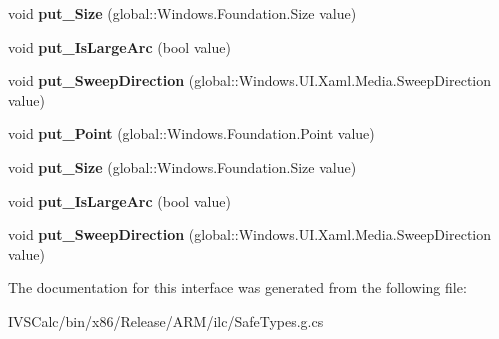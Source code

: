 \begin{DoxyCompactItemize}
\mbox{\label{interface_windows_1_1_u_i_1_1_xaml_1_1_media_1_1_i_arc_segment_a38665026a67cd69927958162dd6dc109}} 
void {\bfseries put\+\_\+\+Size} (global\+::\+Windows.\+Foundation.\+Size value)
\item 
\mbox{\label{interface_windows_1_1_u_i_1_1_xaml_1_1_media_1_1_i_arc_segment_ae090da4e0e10d6c6fba41eb81f4e56f4}} 
void {\bfseries put\+\_\+\+Is\+Large\+Arc} (bool value)
\item 
\mbox{\label{interface_windows_1_1_u_i_1_1_xaml_1_1_media_1_1_i_arc_segment_aa5c0f05483cfe843d18d35db2877ad20}} 
void {\bfseries put\+\_\+\+Sweep\+Direction} (global\+::\+Windows.\+U\+I.\+Xaml.\+Media.\+Sweep\+Direction value)
\item 
\mbox{\label{interface_windows_1_1_u_i_1_1_xaml_1_1_media_1_1_i_arc_segment_aa012b7d8361f03f19e160daaac966cb2}} 
void {\bfseries put\+\_\+\+Point} (global\+::\+Windows.\+Foundation.\+Point value)
\item 
\mbox{\label{interface_windows_1_1_u_i_1_1_xaml_1_1_media_1_1_i_arc_segment_a38665026a67cd69927958162dd6dc109}} 
void {\bfseries put\+\_\+\+Size} (global\+::\+Windows.\+Foundation.\+Size value)
\item 
\mbox{\label{interface_windows_1_1_u_i_1_1_xaml_1_1_media_1_1_i_arc_segment_ae090da4e0e10d6c6fba41eb81f4e56f4}} 
void {\bfseries put\+\_\+\+Is\+Large\+Arc} (bool value)
\item 
\mbox{\label{interface_windows_1_1_u_i_1_1_xaml_1_1_media_1_1_i_arc_segment_aa5c0f05483cfe843d18d35db2877ad20}} 
void {\bfseries put\+\_\+\+Sweep\+Direction} (global\+::\+Windows.\+U\+I.\+Xaml.\+Media.\+Sweep\+Direction value)
\end{DoxyCompactItemize}


The documentation for this interface was generated from the following file\+:\begin{DoxyCompactItemize}
\item 
I\+V\+S\+Calc/bin/x86/\+Release/\+A\+R\+M/ilc/Safe\+Types.\+g.\+cs\end{DoxyCompactItemize}

